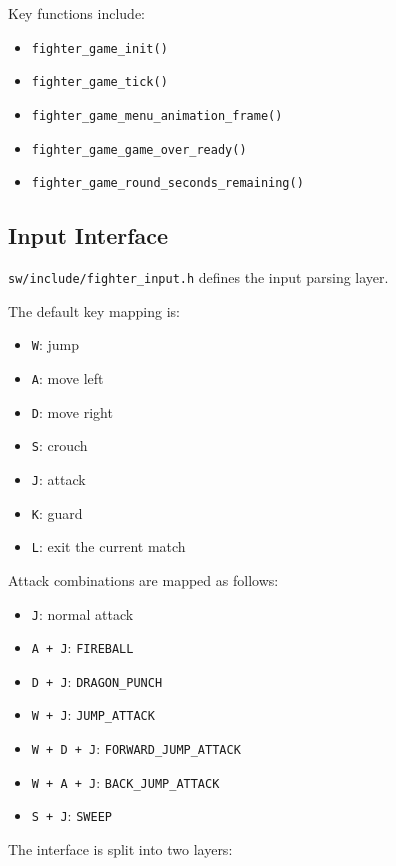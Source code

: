 \documentclass[12pt,a4paper]{article}
\begin{document}
Key functions include:

\begin{itemize}
  \item \texttt{fighter\_game\_init()}
  \item \texttt{fighter\_game\_tick()}
  \item \texttt{fighter\_game\_menu\_animation\_frame()}
  \item \texttt{fighter\_game\_game\_over\_ready()}
  \item \texttt{fighter\_game\_round\_seconds\_remaining()}
\end{itemize}

\subsection{Input Interface}

\texttt{sw/include/fighter\_input.h} defines the input parsing layer.

The default key mapping is:

\begin{itemize}
  \item \texttt{W}: jump
  \item \texttt{A}: move left
  \item \texttt{D}: move right
  \item \texttt{S}: crouch
  \item \texttt{J}: attack
  \item \texttt{K}: guard
  \item \texttt{L}: exit the current match
\end{itemize}

Attack combinations are mapped as follows:

\begin{itemize}
  \item \texttt{J}: normal attack
  \item \texttt{A + J}: \texttt{FIREBALL}
  \item \texttt{D + J}: \texttt{DRAGON\_PUNCH}
  \item \texttt{W + J}: \texttt{JUMP\_ATTACK}
  \item \texttt{W + D + J}: \texttt{FORWARD\_JUMP\_ATTACK}
  \item \texttt{W + A + J}: \texttt{BACK\_JUMP\_ATTACK}
  \item \texttt{S + J}: \texttt{SWEEP}
\end{itemize}

The interface is split into two layers:
\end{document}
